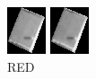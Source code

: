 \documentclass[a4paper,12pt]{article}  %
\begin{document}
\begin{figure}[H]
\begin{minipage}{0.24\textwidth}
        \includegraphics[width=\linewidth]{spektralne/red_budynek0.png}
        \caption*{RED}
    \end{minipage}
    \begin{minipage}{0.24\textwidth}
        \centering
        \includegraphics[width=\linewidth]{spektralne/green_budynek0.png}

\end{minipage}
\end{figure}
\end{document}
